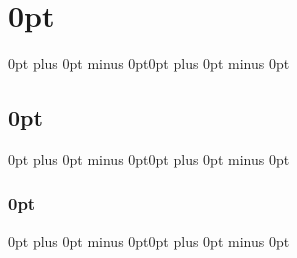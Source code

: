 \documentclass[12pt, a4paper]{extarticle}
\begin{document}

\titlespacing\section{0pt}{0pt plus 0pt minus 0pt}{0pt plus 0pt minus 0pt}
\titlespacing\subsection{0pt}{0pt plus 0pt minus 0pt}{0pt plus 0pt minus 0pt}
\titlespacing\subsubsection{0pt}{0pt plus 0pt minus 0pt}{0pt plus 0pt minus 0pt}



\setlength{\tabcolsep}{0pt}

\raggedright

\end{document}
